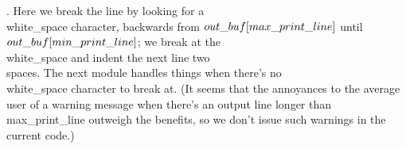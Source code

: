 .
Here we break the line by looking for a \\{white\_space} character,
backwards from $\\{out\_buf}[\\{max\_print\_line}]$ until
$\\{out\_buf}[\\{min\_print\_line}]$; we break at the \\{white\_space} and
indent
the next line two \\{space}s.  The next module handles things when
there's no \\{white\_space} character to break at.  (It seems that the
annoyances to the average user of a warning message when there's an
output line longer than \\{max\_print\_line} outweigh the benefits, so we
don't issue such warnings in the current code.)

